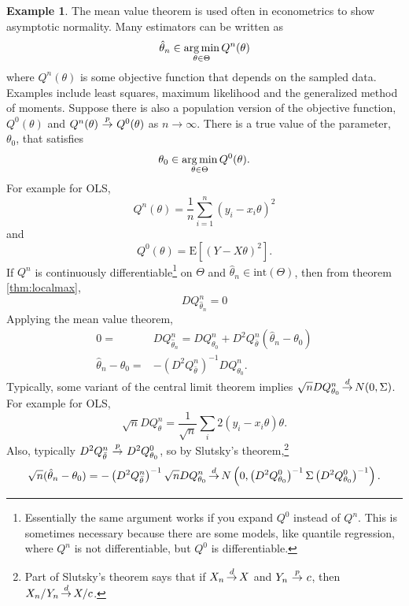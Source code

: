 \documentclass[12pt,reqno]{amsart}
\theoremstyle{definition}
\newtheorem{example}{Example}[section]
\newcommand{\argmin}{\operatornamewithlimits{arg\,min}}
\def\inprobHIGH{\,{\buildrel p \over \rightarrow}\,}
\def\inprob{\,{\inprobHIGH}\,}
\def\indist{\,{\buildrel d \over \rightarrow}\,}
\renewcommand{\to}{{\rightarrow}}
\begin{document}
\begin{example}
  The mean value theorem is used often in econometrics to show
  asymptotic normality. Many estimators can be written as
  \begin{align*}
    \hat{\theta}_n \in \argmin_{\theta \in \Theta} Q^n(\theta) 
  \end{align*}
  where $Q^n(\theta)$ is some objective function that depends on the
  sampled data. Examples include least squares, maximum likelihood and
  the generalized method of moments.  Suppose there is also a
  population version of the objective function, $Q^0(\theta)$ and
  $Q^n(\theta) \inprob Q^0(\theta)$ as $n \to \infty$. There is a true
  value of the parameter, $\theta_0$, that satisfies
  \[ \theta_0 \in \argmin_{\theta \in \Theta} Q^0(\theta). \] 
  For example for OLS, 
  \[ Q^n(\theta) = \frac{1}{n} \sum_{i=1}^n (y_i - x_i \theta)^2 \]
  and
  \[ Q^0(\theta) = \mathrm{E}\left[ (Y - X \theta)^2 \right]. \] If
  $Q^n$ is continuously differentiable\footnote{Essentially the same
    argument works if you expand $Q^0$ instead of $Q^n$. This is
    sometimes necessary because there are some models, like quantile
    regression, where $Q^n$ is not differentiable, but $Q^0$ is
    differentiable.} on $\Theta$ and $\hat{\theta}_n \in
  \mathrm{int}(\Theta)$, then from theorem \ref{thm:localmax},
  \[ DQ^n_{\hat{\theta}_n} = 0 \]
  Applying the mean value theorem, 
  \begin{align*}
    0 = & DQ^n_{\hat{\theta}_n} = DQ^n_{\theta_0} + D^2
    Q^n_{\bar{\theta}}(\hat{\theta}_n - \theta_0 ) \\
    \hat{\theta}_n - \theta_0 = & -\left(D^2 Q^n_{\bar{\theta}}
    \right)^{-1} DQ^n_{\theta_0}.
  \end{align*}
  Typically, some variant of the central limit theorem implies
  $\sqrt{n} DQ^n_{\theta_0} \indist N(0,\Sigma)$. For example for
  OLS,
  \[\sqrt{n} DQ^n_\theta = \frac{1}{\sqrt{n}} \sum_i 2 (y_i - x_i
  \theta ) \theta. \] Also, typically $D^2 Q^n_{\bar{\theta}} \inprob
  D^2 Q^0_{\theta_0}$, so by Slutsky's theorem,\footnote{Part of
    Slutsky's theorem says that if $X_n \indist X$ and $Y_n \inprob
    c$, then $X_n/Y_n \indist X/c$.}
  \[ \sqrt{n} (\hat{\theta}_n - \theta_0 ) = -\left(D^2
    Q^n_{\bar{\theta}} \right)^{-1} \sqrt{n} DQ^n_{\theta_0} \indist
  N\left( 0, \left(D^2 Q^0_{\theta_0} \right)^{-1} \Sigma \left(D^2
      Q^0_{\theta_0} \right)^{-1} \right). \]
\end{example}
\end{document}
